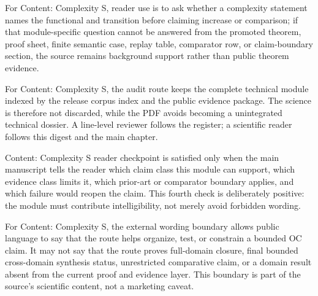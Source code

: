 For Content: Complexity S, reader use is to ask whether a complexity statement names the functional and transition before claiming increase or comparison; if that module-specific question cannot be answered from the promoted theorem, proof sheet, finite semantic case, replay table, comparator row, or claim-boundary section, the source remains background support rather than public theorem evidence.


For Content: Complexity S, the audit route keeps the complete technical module indexed by the release corpus index and the public evidence package. The science is therefore not discarded, while the PDF avoids becoming a unintegrated technical dossier. A line-level reviewer follows the register; a scientific reader follows this digest and the main chapter.


Content: Complexity S reader checkpoint is satisfied only when the main manuscript tells the reader which claim class this module can support, which evidence class limits it, which prior-art or comparator boundary applies, and which failure would reopen the claim. This fourth check is deliberately positive: the module must contribute intelligibility, not merely avoid forbidden wording.


For Content: Complexity S, the external wording boundary allows public language to say that the route helps organize, test, or constrain a bounded OC claim. It may not say that the route proves full-domain closure, final bounded cross-domain synthesis status, unrestricted comparative claim, or a domain result absent from the current proof and evidence layer. This boundary is part of the source's scientific content, not a marketing caveat.
